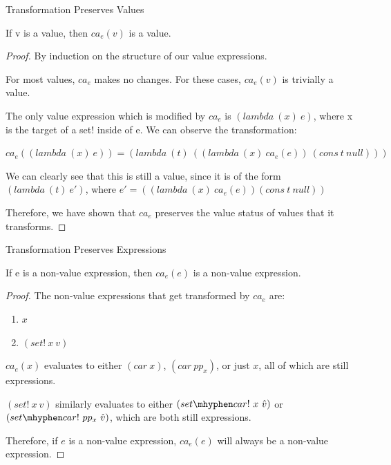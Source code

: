\begin{lemma}\label{lem:trans_val} Transformation Preserves Values

If v is a value, then $ca_e(v)$ is a value.
\end{lemma}
\begin{proof}
By induction on the structure of our value expressions.

For most values, $ca_e$ makes no changes. For these cases, $ca_e(v)$ is trivially a value.

The only value expression which is modified by $ca_e$ is $(lambda\ (x)\ e)$, where x is the target of a set! inside of e. We can observe the transformation:

$ca_e((lambda\ (x)\ e)) = (lambda\ (t)\ ((lambda\ (x)\ ca_e(e))\ (cons\ t\ null)))$

We can clearly see that this is still a value, since it is of the form $(lambda\ (t)\ e')$, where $e' = ((lambda\ (x)\ ca_e(e))(cons\ t\ null))$

Therefore, we have shown that $ca_e$ preserves the value status of values that it transforms.
\end{proof}

\begin{lemma}\label{lem:trans_expr} Transformation Preserves Expressions

If e is a non-value expression, then $ca_e(e)$ is a non-value expression.
\end{lemma}
\begin{proof}
The non-value expressions that get transformed by $ca_e$ are:

\begin{enumerate}
    \item $x$
    \item $(set!\ x\ v)$
\end{enumerate}

$ca_e(x)$ evaluates to either $(car\ x)$, $(car\ pp_x)$, or just $x$, all of which are still expressions.

$(set!\ x\ v)$ similarly evaluates to either $(set \mhyphen car!\ x\ \hat{v})$ or $(set \mhyphen car!\ pp_x\ \hat{v})$, which are both still expressions.

Therefore, if $e$ is a non-value expression, $ca_e(e)$ will always be a non-value expression.

\end{proof}

